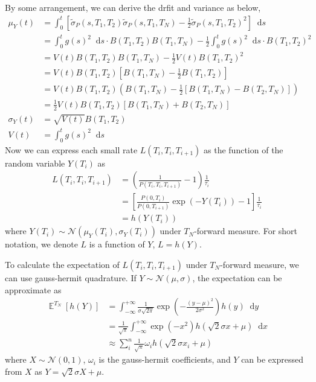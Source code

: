 \documentclass[12pt]{article}
\DeclareMathOperator{\E}{\mathbb{E}}
\newcommand{\dd}{\mathop{}\!\text{d}}
\newcommand{\normaldist}{\mathcal{N}}
\newcommand{\sigmaFP}{\tilde{\sigma}_P}
\newcommand{\half}{\frac{1}{2}}
\begin{document}
By some arrangement, we can derive the drfit and variance
as below,
\begin{align}
    \nonumber
    \mu_{Y}(t) &=
        \int_0^t \left[
            \sigmaFP(s, T_1, T_2) \sigmaFP(s, T_1, T_N)
            - \half \sigmaFP(s, T_1, T_2)^2
        \right] \dd s \\
    \nonumber
    &= \int_0^t g(s)^2 \dd s \cdot B(T_1, T_2) B(T_1, T_N)
    - \half \int_0^t g(s)^2 \dd s \cdot B(T_1, T_2)^2 \\
    \nonumber
    &= V(t) B(T_1, T_2) B(T_1, T_N) - \half V(t) B(T_1, T_2)^2 \\
    \nonumber
    &= V(t) B(T_1, T_2) \left[B(T_1, T_N) - \half B(T_1, T_2)\right]\\
    \nonumber
    &= V(t) B(T_1, T_2) \left( B(T_1, T_N) - \half
        \left[ B(T_1, T_N) - B(T_2, T_N) \right] \right) \\
    &= \half V(t) B(T_1, T_2) \left[B(T_1, T_N) + B(T_2, T_N) \right] \\
    \sigma_{Y}(t) &=\sqrt{V(t)} B(T_1, T_2) \\
    V(t) &= \int_0^t g(s)^2 \dd s
\end{align}
Now we can express each small rate $L(T_i, T_i, T_{i+1})$
as the function of the random variable $Y(T_i)$ as
\begin{align}
    \nonumber
    L(T_i, T_i, T_{i+1}) &= \left(
        \frac{1}{P(T_i, T_i, T_{i+1})} - 1
    \right) \frac{1}{\tau_i} \\
    &= \left[
        \frac{P(0, T_i)}{P(0, T_{i+1})} \exp(-Y(T_i)) - 1
    \right] \frac{1}{\tau_i} \\
    &= h\left(Y(T_i)\right)
\end{align}
where $Y(T_i) \sim \normaldist\left(\mu_Y(T_i), \sigma_{Y}(T_i)\right)$
under $T_N$-forward measure. For short notation,
we denote $L$ is a function of $Y$, $L = h(Y)$.

To calculate the expectation of $L(T_i, T_i, T_{i+1})$
under $T_N$-forward measure, we can use gauss-hermit quadrature.
If $Y\sim \normaldist(\mu, \sigma)$, the expectation can be
approximate as
\begin{align}
    \E^{T_N} \left[h(Y)\right] 
        &= \int_{-\infty}^{+\infty}
            \frac{1}{\sigma \sqrt{2\pi}} \exp\left(
                -\frac{(y-\mu)^2}{2\sigma^2}
            \right) h(y) \dd y \\
        &= \frac{1}{\sqrt{\pi}} \int_{-\infty}^{+\infty}
            \exp(-x^2) h(\sqrt{2} \sigma x + \mu) \dd x \\
        &\approx \sum_i^n \frac{1}{\sqrt{\pi}} \omega_{i} h(\sqrt{2}\sigma x_i + \mu)
\end{align}
where $X\sim \normaldist(0,1)$, $\omega_{i}$ is the gauss-hermit
coefficients, and $Y$ can be expressed from $X$ as
$ Y = \sqrt{2}\sigma X + \mu$.
\end{document}
